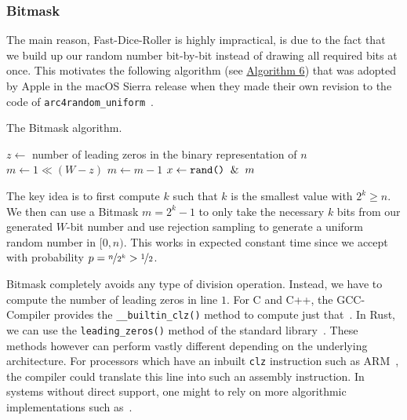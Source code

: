 \documentclass[a4paper, UKenglish, cleveref, autoref, thm-restate]{lipics-v2021}
\begin{document}
\subsubsection{Bitmask}\label{sec:2.2.4}
The main reason, Fast-Dice-Roller is highly impractical, is due to the fact that we build up our random number bit-by-bit instead of drawing all required bits at once.
This motivates the following algorithm (see \hyperref[alg:bitmask]{Algorithm 6}) that was adopted by Apple in the macOS Sierra release when they made their own revision to the code of \texttt{arc4random\_uniform}~\cite{Apple}.

\begin{algorithm}[!htb] \label{alg:bitmask}
    \caption{The Bitmask algorithm.}
    \Require{source of uniformly-distributed random integers in $[0,2^W)$ given by \texttt{rand()}}
    $z \leftarrow$ number of leading zeros in the binary representation of $n$\;
    $m \leftarrow 1 \ll (W - z)$
    $m \leftarrow m - 1$\;
    $x \leftarrow \texttt{rand()} \And m$\;
    \;
\end{algorithm}

The key idea is to first compute $k$ such that $k$ is the smallest value with $2^k \geq n$.
We then can use a Bitmask $m = 2^k - 1$ to only take the necessary $k$ bits from our generated $W$-bit number and use rejection sampling to generate a uniform random number in $[0,n)$.
This works in expected constant time since we accept with probability $p = \nicefrac{n}{2^k} > \nicefrac{1}{2}$.

Bitmask completely avoids any type of division operation.
Instead, we have to compute the number of leading zeros in line $1$.
For C and C++, the GCC-Compiler provides the \texttt{\_\_builtin\_clz()} method to compute just that~\cite{GccCLZ}.
In Rust, we can use the \texttt{leading\_zeros()} method of the standard library~\cite{RustCLZ}.
These methods however can perform vastly different depending on the underlying architecture.
For processors which have an inbuilt \texttt{clz} instruction such as ARM~\cite{ArmCLZ}, the compiler could translate this line into such an assembly instruction.
In systems without direct support, one might to rely on more algorithmic implementations such as~\cite{ImplCLZ}.


\end{document}

